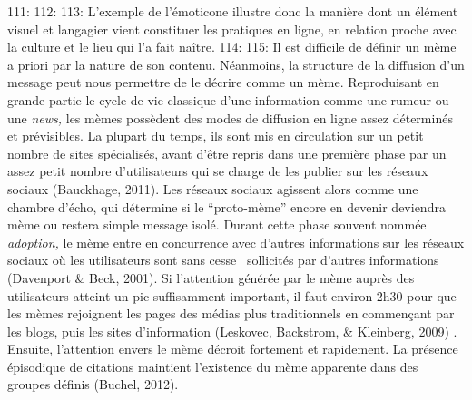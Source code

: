 111: 
112: 
113: L{\textquoteright}exemple de l{\textquoteright}\'emoticone illustre donc la mani\`ere dont un \'el\'ement visuel et langagier vient constituer les pratiques en ligne, en relation proche avec la culture et le lieu qui l{\textquoteright}a fait na\^itre. 
114: 
115: Il est difficile de d\'efinir un m\`eme a priori par la nature de son contenu. N\'eanmoins, la structure de la diffusion d{\textquoteright}un message peut nous permettre de le d\'ecrire comme un m\`eme. Reproduisant en grande partie le cycle de vie classique d{\textquoteright}une information comme une rumeur ou une \textit{news, }les m\`emes poss\`edent des modes de diffusion en ligne assez d\'etermin\'es et pr\'evisibles. La plupart du temps, ils sont mis en circulation sur un petit nombre de sites sp\'ecialis\'es, avant d{\textquoteright}\^etre repris dans une premi\`ere phase par un assez petit nombre d{\textquoteright}utilisateurs qui se charge de les publier sur les r\'eseaux sociaux (Bauckhage, 2011). Les r\'eseaux sociaux agissent alors comme une chambre d{\textquoteright}\'echo, qui d\'etermine si le {\textquotedblleft}proto-m\`eme{\textquotedblright} encore en devenir deviendra m\`eme ou restera simple message isol\'e. Durant cette phase souvent nomm\'ee \textit{adoption,} le m\`eme entre en concurrence avec d{\textquoteright}autres informations sur les r\'eseaux sociaux o\`u les utilisateurs sont sans cesse \ sollicit\'es par d{\textquoteright}autres informations (Davenport \& Beck, 2001). Si l{\textquoteright}attention g\'en\'er\'ee par le m\`eme aupr\`es des utilisateurs atteint un pic suffisamment important, il faut environ 2h30 pour que les m\`emes rejoignent les pages des m\'edias plus traditionnels en commen\c{c}ant par les blogs, puis les sites d{\textquoteright}information (Leskovec, Backstrom, \& Kleinberg, 2009) . Ensuite, l{\textquoteright}attention envers le m\`eme d\'ecroit fortement et rapidement. La pr\'esence \'episodique de citations maintient l{\textquoteright}existence du m\`eme apparente dans des groupes d\'efinis (Buchel, 2012).
